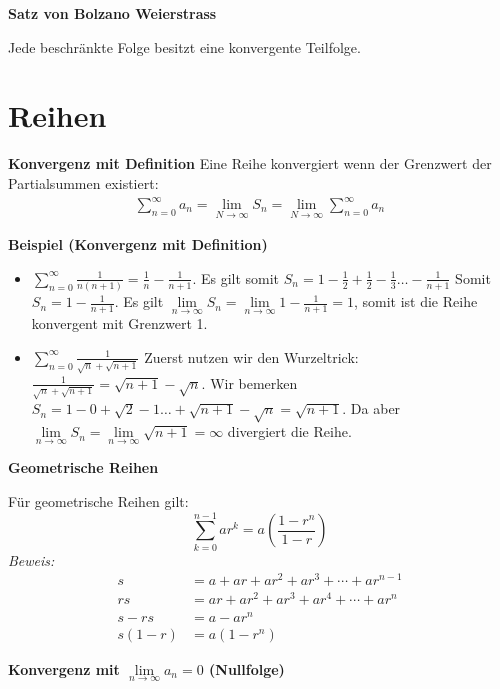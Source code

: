 \documentclass[25pt]{sciposter}
\newcommand{\limm}{\lim\limits_{n \to \infty}}
\newenvironment{method}[1]{\begin{mdframed}[backgroundcolor=blue!10,innertopmargin=15pt, innerbottommargin=15pt, nobreak=true]
		\textbf{#1 }
	}
	{ 
	\end{mdframed}
}
\begin{document}
\begin{multicols}{3}
\begin{method}{Satz von Bolzano Weierstrass}
	Jede beschränkte Folge besitzt eine konvergente Teilfolge.
\end{method}



\section{Reihen}

\begin{method}{Konvergenz mit Definition} Eine Reihe konvergiert wenn der Grenzwert der Partialsummen existiert:
	\begin{align*}
			\sum_{n=0}^{\infty} a_n  = \lim\limits_{N\to\infty} S_n = \lim\limits_{N\to\infty} \sum_{n=0}^{\infty} a_n
	\end{align*}
\end{method}

\textbf{Beispiel (Konvergenz mit Definition)}
\begin{itemize}
	\item $\sum_{n = 0}^{\infty} \frac{1}{n(n+1)} = \frac{1}{n} - \frac{1}{n+1}$. Es gilt somit $S_n = 1 - \frac{1}{2} + \frac{1}{2} - \frac{1}{3} \ldots - \frac{1}{n+1}$ Somit $S_n = 1-\frac{1}{n+1}$. Es gilt $\limm S_n = \limm 1 - \frac{1}{n+1} = 1$, somit ist die Reihe konvergent mit Grenzwert 1.
	\item $\sum_{n = 0}^{\infty} \frac{1}{\sqrt{n} + \sqrt{n+1}} $ Zuerst nutzen wir den Wurzeltrick: $\frac{1}{\sqrt{n} + \sqrt{n+1}} = \sqrt{n+1} - \sqrt{n}$. Wir bemerken $S_n = 1 - 0 + \sqrt{2} - 1 \ldots + \sqrt{n+1} - \sqrt{n} = \sqrt{n+1}$. Da aber $\limm S_n =  \limm \sqrt{n+1} = \infty$ divergiert die Reihe.
\end{itemize}

\begin{method}{Geometrische Reihen}
	Für geometrische Reihen gilt:
	$$\sum _{k=0}^{n-1}ar^{k}=a\left({\frac {1-r^{n}}{1-r}}\right)$$
	\textit{Beweis:}
	\begin{align*}
	s&=a+ar+ar^{2}+ar^{3}+\cdots +ar^{n-1}\\
	rs&=ar+ar^{2}+ar^{3}+ar^{4}+\cdots +ar^{n}\\
	s-rs&=a-ar^{n}\\
	s(1-r)&=a(1-r^{n})
	\end{align*}
\end{method}

\begin{method}{Konvergenz mit $\lim\limits_{n \to \infty } a_n = 0$ (Nullfolge)}


\end{method}
\end{multicols}
\end{document}
